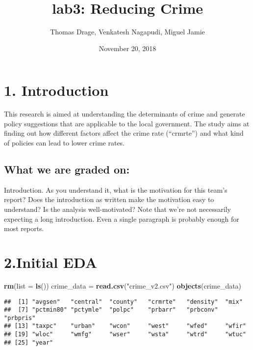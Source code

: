 \documentclass[]{article}
\title{lab3: Reducing Crime}
\author{Thomas Drage, Venkatesh Nagapudi, Miguel Jamie}
\date{November 20, 2018}
\newenvironment{Shaded}{\begin{snugshade}}{\end{snugshade}}
\newcommand{\KeywordTok}[1]{\textcolor[rgb]{0.13,0.29,0.53}{\textbf{#1}}}
\newcommand{\DataTypeTok}[1]{\textcolor[rgb]{0.13,0.29,0.53}{#1}}
\newcommand{\StringTok}[1]{\textcolor[rgb]{0.31,0.60,0.02}{#1}}
\newcommand{\NormalTok}[1]{#1}
\begin{document}
\maketitle

\section{1. Introduction}\label{introduction}

This research is aimed at understanding the determinants of crime and
generate policy suggestions that are applicable to the local government.
The study aims at finding out how different factors affect the crime
rate (``crmrte'') and what kind of policies can lead to lower crime
rates.

\subsection{What we are graded on:}\label{what-we-are-graded-on}

Introduction. As you understand it, what is the motivation for this
team's report? Does the introduction as written make the motivation easy
to understand? Is the analysis well-motivated? Note that we're not
necessarily expecting a long introduction. Even a single paragraph is
probably enough for most reports.

\section{2.Initial EDA}\label{initial-eda}

\begin{Shaded}
\begin{Highlighting}[]
\KeywordTok{rm}\NormalTok{(}\DataTypeTok{list =} \KeywordTok{ls}\NormalTok{())}
\NormalTok{crime_data =}\StringTok{ }\KeywordTok{read.csv}\NormalTok{(}\StringTok{"crime_v2.csv"}\NormalTok{)}
\KeywordTok{objects}\NormalTok{(crime_data)}
\end{Highlighting}
\end{Shaded}

\begin{verbatim}
##  [1] "avgsen"   "central"  "county"   "crmrte"   "density"  "mix"     
##  [7] "pctmin80" "pctymle"  "polpc"    "prbarr"   "prbconv"  "prbpris" 
## [13] "taxpc"    "urban"    "wcon"     "west"     "wfed"     "wfir"    
## [19] "wloc"     "wmfg"     "wser"     "wsta"     "wtrd"     "wtuc"    
## [25] "year"
\end{verbatim}
\end{document}
